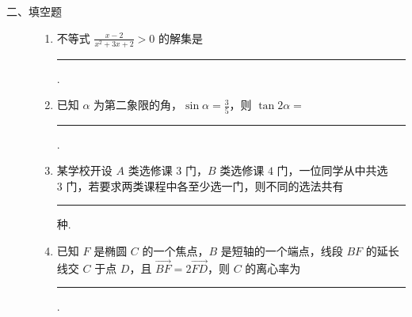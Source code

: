 \begin{description}

    \item[二、填空题]

    \begin{enumerate}[leftmargin=5pt]

      \addtocounter{enumi}{+12}

        \item 不等式 \(\frac{x - 2}{x^2 + 3x + 2} > 0\) 的解集是\rule[-0.3ex]{3em}{0.4pt}.

        \item 已知 \(\alpha\) 为第二象限的角，\(\sin \alpha = \frac{3}{5}\)，则 \(\tan 2\alpha =\)\rule[-0.3ex]{3em}{0.4pt}.

        \item 某学校开设 \(A\) 类选修课 \(3\text{ 门}\)，\(B\) 类选修课 \(4\text{ 门}\)，一位同学从中共选 \(3\text{ 门}\)，若要求两类课程中各至少选一门，则不同的选法共有\rule[-0.3ex]{3em}{0.4pt}\(\text{种}\).

        \item 已知 \(F\) 是椭圆 \(C\) 的一个焦点，\(B\) 是短轴的一个端点，线段 \(BF\) 的延长线交 \(C\) 于点 \(D\)，且 \( \overrightarrow{BF} = 2\overrightarrow{FD} \)，则 \(C\) 的离心率为\rule[-0.3ex]{3em}{0.4pt}.

    \end{enumerate}

\end{description}

